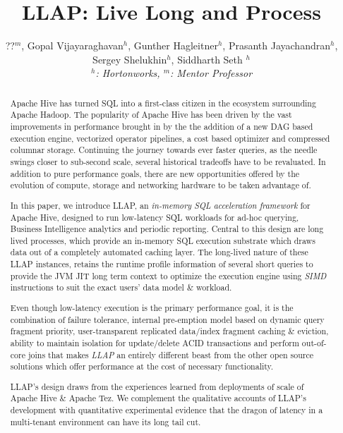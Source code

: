 \documentclass{vldb}
\begin{document}
\title{LLAP: Live Long and Process}

\author{
\alignauthor
??$^m$, Gopal Vijayaraghavan$^h$, Gunther Hagleitner$^h$, Prasanth Jayachandran$^h$, \\ 
Sergey Shelukhin$^h$, Siddharth Seth $^h$
\\
{\large \emph{$^h$: Hortonworks, $^m$: Mentor Professor}}
}

\maketitle

\begin{abstract}
Apache Hive has turned SQL into a first-class citizen in the ecosystem surrounding Apache Hadoop.
The popularity of Apache Hive has been driven by the vast improvements in performance brought in
by the the addition of a new DAG based execution engine, vectorized operator pipelines, a cost based
optimizer and compressed columnar storage. Continuing the journey towards ever faster queries,
as the needle swings closer to sub-second scale, several historical tradeoffs have to be revaluated.  
In addition to pure performance goals, there are new opportunities offered by the evolution of compute, 
storage and networking hardware to be taken advantage of.


In this paper, we introduce LLAP, an \emph{in-memory SQL acceleration framework} for Apache Hive, designed
to run low-latency SQL workloads for ad-hoc querying, Business Intelligence analytics and periodic reporting.
Central to this design are long lived processes, which provide an in-memory SQL execution substrate which draws
data out of a completely automated caching layer. The long-lived nature of these LLAP instances, retains the runtime profile
information of several short queries to provide the JVM JIT long term context to optimize the execution engine
using \emph{SIMD} instructions to suit the exact users' data model \& workload.


Even though low-latency execution is the primary performance goal, it is the combination of failure tolerance, 
internal pre-emption model based on dynamic query fragment priority, user-transparent replicated data/index fragment
caching \& eviction, ability to maintain isolation for update/delete ACID transactions and perform out-of-core joins 
that makes \emph{LLAP} an entirely different beast from the other open source solutions which offer performance at the cost
of necessary functionality.


LLAP's design draws from the experiences learned from deployments of scale of Apache Hive \& Apache Tez. We complement
the qualitative accounts of LLAP's development with quantitative experimental evidence that the dragon of latency in
a multi-tenant environment can have its long tail cut.


\end{abstract}
\end{document}

